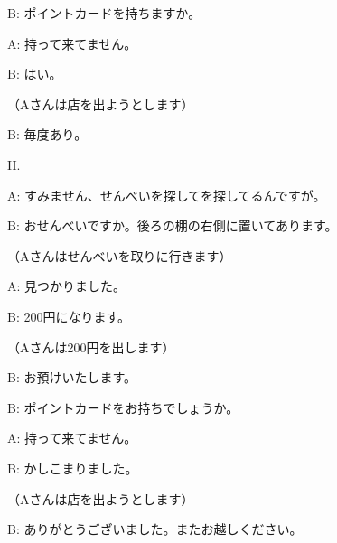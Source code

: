 	B: ポイントカードを持ちますか。

	A: 持って来てません。

	B: はい。

	（Aさんは店を出ようとします）

	B: 毎度あり。
	
	II.
	
	A: すみません、せんべいを探してを探してるんですが。
	
	B: おせんべいですか。後ろの棚の右側に置いてあります。
	
	（Aさんはせんべいを取りに行きます）
	
	A: 見つかりました。
	
	B: 200円になります。
	
	（Aさんは200円を出します）
	
	B: お預けいたします。

	B: ポイントカードをお持ちでしょうか。

	A: 持って来てません。

	B: かしこまりました。

	（Aさんは店を出ようとします）

	B: ありがとうございました。またお越しください。
	
	
	
	
